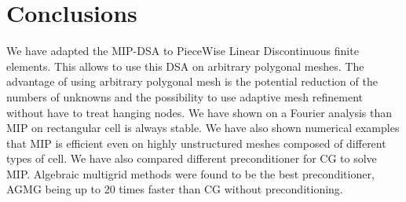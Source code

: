 \section{Conclusions} \label{sec_conc}
We have adapted the MIP-DSA to PieceWise Linear Discontinuous finite elements.
This allows to use this DSA on arbitrary polygonal meshes. The advantage of
using arbitrary polygonal mesh is the potential reduction of the numbers of
unknowns and the possibility to use adaptive mesh refinement without have to
treat hanging nodes. We have shown on a Fourier analysis than MIP on rectangular 
cell is always stable. We have also shown numerical examples that MIP is efficient 
even on highly unstructured meshes composed of different types of cell. We have also
compared different preconditioner for CG to solve MIP. Algebraic multigrid
methods were found to be the best preconditioner, AGMG being up to 20 times
faster than CG without preconditioning.
